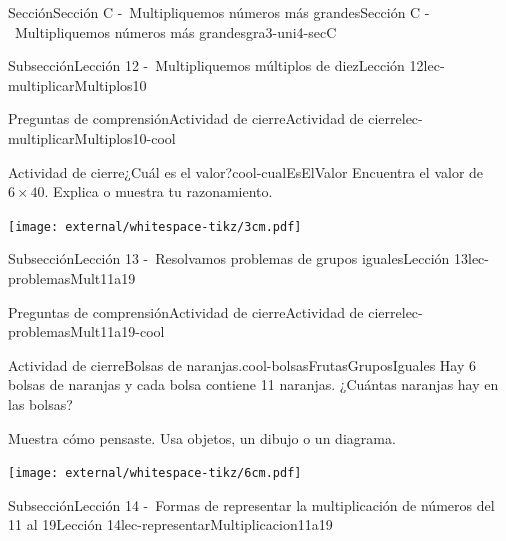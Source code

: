 \begin{sectionptx}{Sección}{Sección C -~Multipliquemos números más grandes}{}{Sección C -~Multipliquemos números más grandes}{}{}{gra3-uni4-secC}
\begin{subsectionptx}{Subsección}{Lección 12 -~Multipliquemos múltiplos de diez}{}{Lección 12}{}{}{lec-multiplicarMultiplos10}
%
\begin{reading-questions-subsubsection}{Preguntas de comprensión}{Actividad de cierre}{}{Actividad de cierre}{}{}{lec-multiplicarMultiplos10-cool}
\begin{project}{Actividad de cierre}{¿Cuál es el valor?}{cool-cualEsElValor}%
Encuentra el valor de \(6\times 40\). Explica o muestra tu razonamiento.%
\begin{image}{0}{1}{0}{}%
\texttt{[image: external/whitespace-tikz/3cm.pdf]}
\end{image}%
\end{project}%
\end{reading-questions-subsubsection}
\end{subsectionptx}
%
%
\typeout{************************************************}
\typeout{************************************************}
%
\begin{subsectionptx}{Subsección}{Lección 13 -~Resolvamos problemas de grupos iguales}{}{Lección 13}{}{}{lec-problemasMult11a19}
%
%
%
%
\typeout{************************************************}
\typeout{************************************************}
%
\begin{reading-questions-subsubsection}{Preguntas de comprensión}{Actividad de cierre}{}{Actividad de cierre}{}{}{lec-problemasMult11a19-cool}
\begin{project}{Actividad de cierre}{Bolsas de naranjas.}{cool-bolsasFrutasGruposIguales}%
Hay 6 bolsas de naranjas y cada bolsa contiene 11 naranjas. ¿Cuántas naranjas hay en las bolsas?%
\par
Muestra cómo pensaste. Usa objetos, un dibujo o un diagrama.%
\begin{image}{0}{1}{0}{}%
\texttt{[image: external/whitespace-tikz/6cm.pdf]}
\end{image}%
\end{project}%
\end{reading-questions-subsubsection}
\end{subsectionptx}
%
%
\typeout{************************************************}
\typeout{************************************************}
%
\begin{subsectionptx}{Subsección}{Lección 14 -~Formas de representar la multiplicación de números del 11 al 19}{}{Lección 14}{}{}{lec-representarMultiplicacion11a19}

\end{subsectionptx}
\end{sectionptx}
